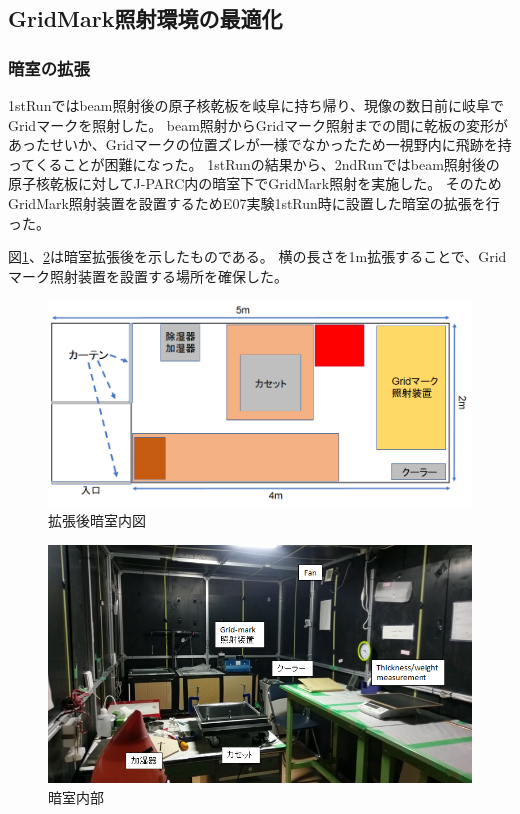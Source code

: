 \documentclass[12pt,a4paper]{jarticle}
\begin{document}
\subsection{GridMark照射環境の最適化}
\subsubsection{暗室の拡張}
1stRunではbeam照射後の原子核乾板を岐阜に持ち帰り、現像の数日前に岐阜でGridマークを照射した。
beam照射からGridマーク照射までの間に乾板の変形があったせいか、Gridマークの位置ズレが一様でなかったため一視野内に飛跡を持ってくることが困難になった。
1stRunの結果から、2ndRunではbeam照射後の原子核乾板に対してJ-PARC内の暗室下でGridMark照射を実施した。
そのためGridMark照射装置を設置するためE07実験1stRun時に設置した暗室の拡張を行った。
\par
図\ref{fig:darkroom_mosikizu}、\ref{fig:darkroom_view}は暗室拡張後を示したものである。
横の長さを1m拡張することで、Gridマーク照射装置を設置する場所を確保した。
\begin{figure}[htbp]
  \centering
    \includegraphics[width=120mm]{darkroom_after.png}
  \caption{拡張後暗室内図\label{fig:darkroom_mosikizu}}
\end{figure}
\begin{figure}[htbp]
  \centering
    \includegraphics[width=120mm]{darkroom_view.png}
  \caption{暗室内部\label{fig:darkroom_view}}
\end{figure}
\end{document}
